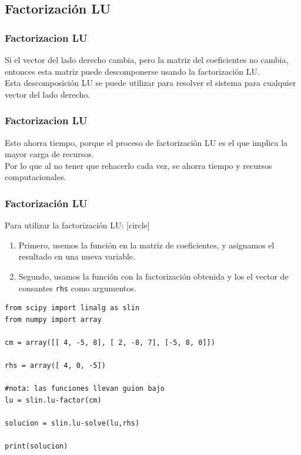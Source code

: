 \subsection{Factorización LU}
\begin{frame}
\frametitle{Factorizacion LU}
Si el vector del lado derecho cambia, pero la matriz del coeficientes no cambia, entonces esta matriz puede descomponerse usando la factorización LU.
\\
\bigskip
Esta descomposición LU se puede utilizar para resolver el sistema para cualquier vector del lado derecho.
\end{frame}
\begin{frame}
\frametitle{Factorizacion LU}
Esto ahorra tiempo, porque el proceso de factorización LU es el que implica la mayor carga de recursos.
\\
\bigskip
Por lo que al no tener que rehacerlo cada vez, se ahorra tiempo y recursos computacionales.
\end{frame}
\begin{frame}
\frametitle{Factorización LU}
Para utilizar la factorización LU:
[circle]
\begin{enumerate}[<+->]
\item Primero, usemos la función  en la matriz de coeficientes, y asignamos el resultado en una nueva variable.
\item Segundo, usamos la función  con la factorización obtenida y los el vector de consantes \texttt{rhs} como argumentos.
\end{enumerate}
\end{frame}
\begin{frame}
\begin{lstlisting}[caption=Uso de scipy.linalg.lu, style=FormattedNumber, basicstyle=\linespread{1.1}\ttfamily=\small, columns=fullflexible]
from scipy import linalg as slin
from numpy import array

cm = array([[ 4, -5, 8], [ 2, -8, 7], [-5, 8, 0]])

rhs = array([ 4, 0, -5])

#nota: las funciones llevan guion bajo
lu = slin.lu-factor(cm)

solucion = slin.lu-solve(lu,rhs)

print(solucion)
\end{lstlisting}
\end{frame}
